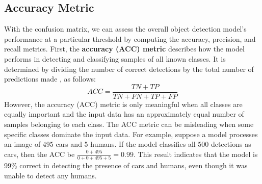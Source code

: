 \subsection{Accuracy Metric}  \label{subsec:accuracy_metric}
With the confusion matrix, we can assess the overall object detection model's performance at a particular threshold by computing the accuracy, precision, and recall metrics. First, the \textbf{accuracy (ACC) metric} describes how the model performs in detecting and classifying samples of all known classes. It is determined by dividing the number of correct detections by the total number of predictions made \cite{szeliski_cv_book}, as follows:
\begin{equation}
    ACC = \frac{TN+TP}{TN+FN+TP+FP} \label{eq:accuracy}
\end{equation}
However, the accuracy (ACC) metric is only meaningful when all classes are equally important and the input data has an approximately equal number of samples belonging to each class. The ACC metric can be misleading when some specific classes dominate the input data. For example, suppose a model processes an image of 495 cars and 5 humans. If the model classifies all 500 detections as cars, then the ACC be $\frac{0+495}{0+0+495+5}=0.99$. This result indicates that the model is 99\% correct in detecting the presence of cars and humans, even though it was unable to detect any humans.

